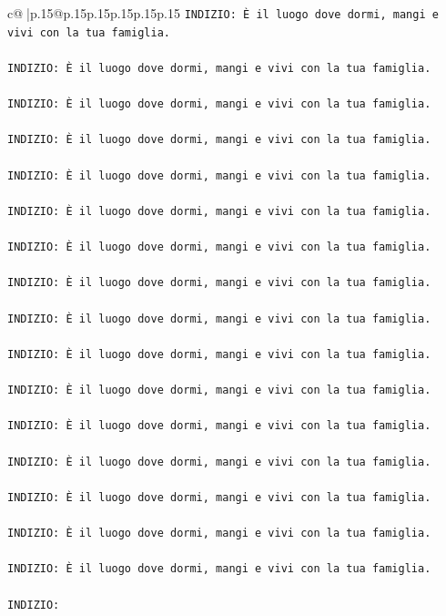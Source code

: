 \documentclass{article}
\begin{document}
{\begin{supertabular}{c@{$\;$}|p{.15\linewidth}@{}p{.15\linewidth}p{.15\linewidth}p{.15\linewidth}p{.15\linewidth}p{.15\linewidth}}
{{{\texttt{INDIZIO: È il luogo dove dormi, mangi e vivi con la tua famiglia.} \\
\\ 
\texttt{INDIZIO: È il luogo dove dormi, mangi e vivi con la tua famiglia.} \\
\\ 
\texttt{INDIZIO: È il luogo dove dormi, mangi e vivi con la tua famiglia.} \\
\\ 
\texttt{INDIZIO: È il luogo dove dormi, mangi e vivi con la tua famiglia.} \\
\\ 
\texttt{INDIZIO: È il luogo dove dormi, mangi e vivi con la tua famiglia.} \\
\\ 
\texttt{INDIZIO: È il luogo dove dormi, mangi e vivi con la tua famiglia.} \\
\\ 
\texttt{INDIZIO: È il luogo dove dormi, mangi e vivi con la tua famiglia.} \\
\\ 
\texttt{INDIZIO: È il luogo dove dormi, mangi e vivi con la tua famiglia.} \\
\\ 
\texttt{INDIZIO: È il luogo dove dormi, mangi e vivi con la tua famiglia.} \\
\\ 
\texttt{INDIZIO: È il luogo dove dormi, mangi e vivi con la tua famiglia.} \\
\\ 
\texttt{INDIZIO: È il luogo dove dormi, mangi e vivi con la tua famiglia.} \\
\\ 
\texttt{INDIZIO: È il luogo dove dormi, mangi e vivi con la tua famiglia.} \\
\\ 
\texttt{INDIZIO: È il luogo dove dormi, mangi e vivi con la tua famiglia.} \\
\\ 
\texttt{INDIZIO: È il luogo dove dormi, mangi e vivi con la tua famiglia.} \\
\\ 
\texttt{INDIZIO: È il luogo dove dormi, mangi e vivi con la tua famiglia.} \\
\\ 
\texttt{INDIZIO: È il luogo dove dormi, mangi e vivi con la tua famiglia.} \\
\\ 
\texttt{INDIZIO:} \\
            }
        }
    }
     \\ \\


\end{supertabular}}
\end{document}
